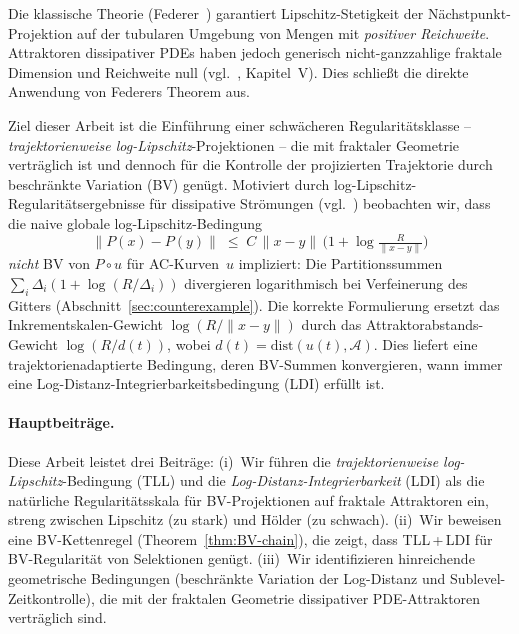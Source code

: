 \documentclass[12pt,a4paper]{article}
\theoremstyle{definition}
\theoremstyle{plain}
\theoremstyle{remark}
\newcommand{\dist}{\mathrm{dist}}
\begin{document}
Die klassische Theorie (Federer~\cite{Federer1959}) garantiert
Lipschitz-Stetigkeit der Nächstpunkt-Projektion auf der tubularen
Umgebung von Mengen mit \emph{positiver Reichweite}.  Attraktoren
dissipativer PDEs haben jedoch generisch nicht-ganzzahlige fraktale
Dimension und Reichweite null
(vgl.~\cite{Temam1997}, Kapitel~V).  Dies schließt die direkte
Anwendung von Federers Theorem aus.

Ziel dieser Arbeit ist die Einführung einer schwächeren
Regularitätsklasse -- \emph{trajektorienweise log-Lipschitz}-Projektionen
-- die mit fraktaler Geometrie verträglich ist und dennoch für die
Kontrolle der projizierten Trajektorie durch beschränkte Variation (BV)
genügt.  Motiviert durch log-Lipschitz-Regularitätsergebnisse für
dissipative Strömungen
(vgl.~\cite{BaeCannone2016}) beobachten wir, dass die naive globale
log-Lipschitz-Bedingung
\begin{equation}\label{eq:global-LL-intro}
  \|P(x) - P(y)\|
  \;\le\;
  C\,\|x-y\|\,\bigl(1 + \log\tfrac{R}{\|x-y\|}\bigr)
\end{equation}
\emph{nicht} BV von $P \circ u$ für AC-Kurven~$u$ impliziert: Die
Partitionssummen $\sum_i \Delta_i(1+\log(R/\Delta_i))$ divergieren
logarithmisch bei Verfeinerung des Gitters
(Abschnitt~\ref{sec:counterexample}).  Die korrekte Formulierung
ersetzt das Inkrementskalen-Gewicht $\log(R/\|x-y\|)$ durch das
Attraktorabstands-Gewicht $\log(R/d(t))$, wobei
$d(t) = \dist(u(t),\mathcal{A})$.  Dies liefert eine
trajektorienadaptierte Bedingung, deren BV-Summen konvergieren,
wann immer eine Log-Distanz-Integrierbarkeitsbedingung (LDI) erfüllt ist.


\paragraph{Hauptbeiträge.}
Diese Arbeit leistet drei Beiträge: (i)~Wir führen die \emph{trajektorienweise log-Lipschitz}-Bedingung (TLL) und die \emph{Log-Distanz-Integrierbarkeit} (LDI) als die natürliche Regularitätsskala für BV-Projektionen auf fraktale Attraktoren ein, streng zwischen Lipschitz (zu stark) und Hölder (zu schwach). (ii)~Wir beweisen eine BV-Kettenregel (Theorem~\ref{thm:BV-chain}), die zeigt, dass TLL\,+\,LDI für BV-Regularität von Selektionen genügt. (iii)~Wir identifizieren hinreichende geometrische Bedingungen (beschränkte Variation der Log-Distanz und Sublevel-Zeitkontrolle), die mit der fraktalen Geometrie dissipativer PDE-Attraktoren verträglich sind.
\end{document}
